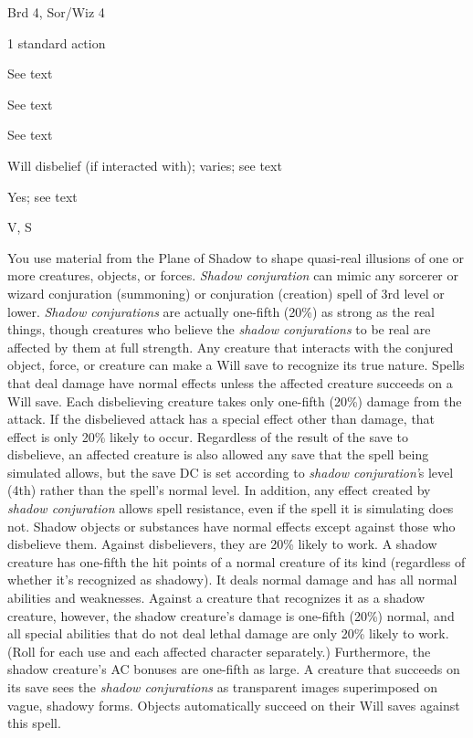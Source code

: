 
\begin{description*}
\item[Level:] Brd 4, Sor/Wiz 4
\item[Casting Time:] 1 standard action
\item[Range:] See text
\item[Effect:] See text
\item[Duration:] See text
\item[Saving Throw:] Will disbelief (if interacted with); varies; see text
\item[Spell Resistance:] Yes; see text
\item[Components:] V, S
\end{description*}

You use material from the Plane of Shadow to shape quasi-real illusions of one
or more creatures, objects, or forces. \textit{Shadow conjuration} can mimic any
sorcerer or wizard conjuration (summoning) or conjuration (creation) spell of 3rd
level or lower.
\textit{Shadow conjurations} are actually one-fifth (20\%) as strong as the real
things, though creatures who believe the \textit{shadow conjurations} to be real
are affected by them at full strength.
Any creature that interacts with the conjured object, force, or creature can make
a Will save to recognize its true nature.
Spells that deal damage have normal effects unless the affected creature succeeds
on a Will save. Each disbelieving creature takes only one-fifth (20\%) damage from
the attack. If the disbelieved attack has a special effect other than damage, that
effect is only 20\% likely to occur. Regardless of the result of the save to disbelieve,
an affected creature is also allowed any save that the spell being simulated allows,
but the save DC is set according to \textit{shadow conjuration'}s level (4th) rather
than the spell's normal level. In addition, any effect created by \textit{shadow
conjuration} allows spell resistance, even if the spell it is simulating does not.
Shadow objects or substances have normal effects except against those who disbelieve
them.
Against disbelievers, they are 20\% likely to work.
A shadow creature has one-fifth the hit points of a normal creature of its kind
(regardless of whether it's recognized as shadowy). It deals normal damage and
has all normal abilities and weaknesses. Against a creature that recognizes it
as a shadow creature, however, the shadow creature's damage is one-fifth (20\%)
normal, and all special abilities that do not deal lethal damage are only 20\%
likely to work. (Roll for each use and each affected character separately.) Furthermore,
the shadow creature's AC bonuses are one-fifth as large.
A creature that succeeds on its save sees the \textit{shadow conjurations} as transparent
images superimposed on vague, shadowy forms.
Objects automatically succeed on their Will saves against this spell.